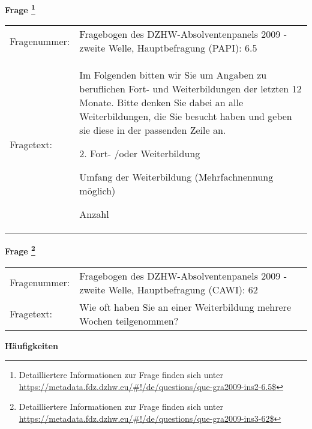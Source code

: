 				\vspace*{0.5cm}
                \noindent\textbf{Frage
	                \footnote{Detailliertere Informationen zur Frage finden sich unter
		              \url{https://metadata.fdz.dzhw.eu/\#!/de/questions/que-gra2009-ins2-6.5$}}}\\
				\begin{tabularx}{\hsize}{@{}lX}
					Fragenummer: &
					  Fragebogen des DZHW-Absolventenpanels 2009 - zweite Welle, Hauptbefragung (PAPI):
					  6.5
 \\
					Fragetext: & Im Folgenden bitten wir Sie um Angaben zu beruflichen Fort- und Weiterbildungen der letzten 12 Monate. Bitte denken Sie dabei an alle Weiterbildungen, die Sie besucht haben und geben sie diese in der passenden Zeile an.\par  2. Fort- /oder Weiterbildung\par  Umfang der Weiterbildung (Mehrfachnennung möglich)\par  Anzahl \\
				\end{tabularx}
				\vspace*{0.5cm}
                \noindent\textbf{Frage
	                \footnote{Detailliertere Informationen zur Frage finden sich unter
		              \url{https://metadata.fdz.dzhw.eu/\#!/de/questions/que-gra2009-ins3-62$}}}\\
				\begin{tabularx}{\hsize}{@{}lX}
					Fragenummer: &
					  Fragebogen des DZHW-Absolventenpanels 2009 - zweite Welle, Hauptbefragung (CAWI):
					  62
 \\
					Fragetext: & Wie oft haben Sie an einer Weiterbildung mehrere Wochen teilgenommen? \\
				\end{tabularx}





        		\vspace*{0.5cm}
                \noindent\textbf{Häufigkeiten}


